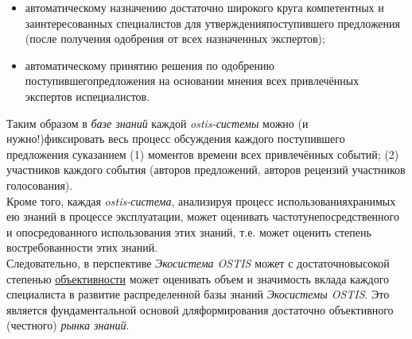 \begin{scnsubstruct}
{\begin{itemize}
            \item автоматическому назначению достаточно широкого круга компетентных и заинтересованных специалистов для утвержденияпоступившего предложения (после получения одобрения от всех назначенных экспертов);
            \item автоматическому принятию решения по одобрению поступившегопредложения на основании мнения всех привлечённых экспертов испециалистов.
        \end{itemize}
        Таким образом в \textit{базе знаний} каждой \textit{ostis-системы} можно (и нужно!)фиксировать весь процесс обсуждения каждого поступившего предложения суказанием (1) моментов времени всех привлечённых событий; (2) участников каждого события (авторов предложений, авторов рецензий участников голосования).\\
        Кроме того, каждая \textit{ostis-система}, анализируя процесс использованияхранимых ею знаний в процессе эксплуатации, может оценивать частотунепосредственного и опосредованного использования этих знаний, т.е. может оценить степень востребованности этих знаний.\\
        Следовательно, в перспективе \textit{Экосистема OSTIS} может с достаточновысокой степенью \uline{объективности} может оценивать объем и значимость вклада каждого специалиста в развитие распределенной базы знаний \textit{Экосистемы OSTIS}. Это является фундаментальной основой дляформирования достаточно объективного (честного) \textit{рынка знаний}.}
        

\end{scnsubstruct}
